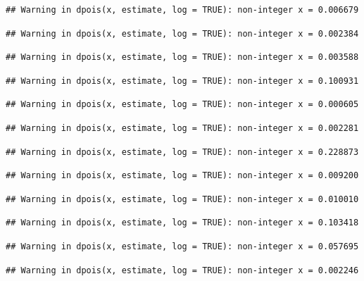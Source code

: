 \documentclass[]{article}
\begin{document}
\begin{verbatim}
## Warning in dpois(x, estimate, log = TRUE): non-integer x = 0.006679
\end{verbatim}

\begin{verbatim}
## Warning in dpois(x, estimate, log = TRUE): non-integer x = 0.002384
\end{verbatim}

\begin{verbatim}
## Warning in dpois(x, estimate, log = TRUE): non-integer x = 0.003588
\end{verbatim}

\begin{verbatim}
## Warning in dpois(x, estimate, log = TRUE): non-integer x = 0.100931
\end{verbatim}

\begin{verbatim}
## Warning in dpois(x, estimate, log = TRUE): non-integer x = 0.000605
\end{verbatim}

\begin{verbatim}
## Warning in dpois(x, estimate, log = TRUE): non-integer x = 0.002281
\end{verbatim}

\begin{verbatim}
## Warning in dpois(x, estimate, log = TRUE): non-integer x = 0.228873
\end{verbatim}

\begin{verbatim}
## Warning in dpois(x, estimate, log = TRUE): non-integer x = 0.009200
\end{verbatim}

\begin{verbatim}
## Warning in dpois(x, estimate, log = TRUE): non-integer x = 0.010010
\end{verbatim}

\begin{verbatim}
## Warning in dpois(x, estimate, log = TRUE): non-integer x = 0.103418
\end{verbatim}

\begin{verbatim}
## Warning in dpois(x, estimate, log = TRUE): non-integer x = 0.057695
\end{verbatim}

\begin{verbatim}
## Warning in dpois(x, estimate, log = TRUE): non-integer x = 0.002246
\end{verbatim}
\end{document}
